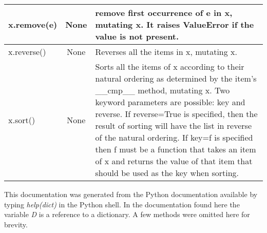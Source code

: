 \begin{center}
{\begin{tabular}{|l|c|p{3in}|}
   
       x.remove(e) & None & remove first occurrence of e in x, mutating x.
       It raises ValueError if the value is not present.\\ \hline
   
   
       x.reverse() & None & Reverses all the items in x, mutating x.\\ \hline
   
   
       x.sort() & None & Sorts all the items of x according to their natural ordering as determined by the item's \_\_cmp\_\_ method, mutating x. Two keyword parameters are possible: key and reverse. If reverse=True is specified, then the result of sorting will have the list in reverse of the natural ordering. If key=f is specified then f must be a function that takes an item of x and returns the value of that item that should be used as the key when sorting. \\ \hline

\end{tabular}}
\end{center}
\newpage

\label{dictmethods}

This documentation was generated from the Python documentation available by typing {\em help(dict)} in the Python shell. In the documentation found here the variable {\em D} is a reference to a dictionary. A few methods were omitted here for brevity.

